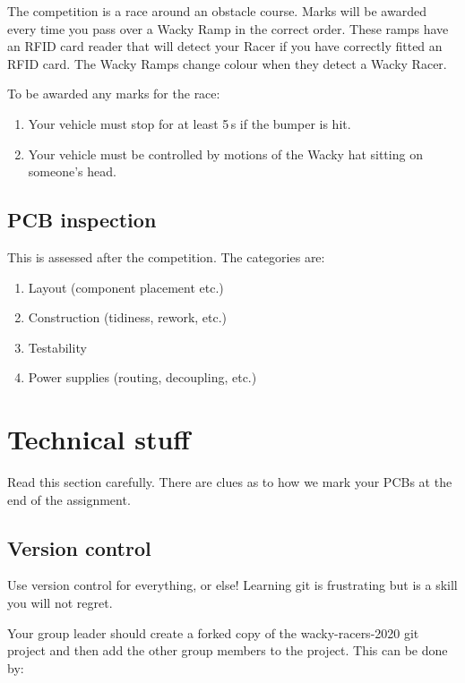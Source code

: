 \documentclass[11pt, a4paper]{article}
\begin{document}
The competition is a race around an obstacle course.  Marks will be
awarded every time you pass over a Wacky Ramp in the correct order.
These ramps have an RFID card reader that will detect your Racer if
you have correctly fitted an RFID card.  The Wacky Ramps change colour
when they detect a Wacky Racer.

To be awarded any marks for the race:
%
\begin{enumerate}
\item Your vehicle must stop for at least 5\,s if the bumper is hit.

\item Your vehicle must be controlled by motions of the Wacky hat
  sitting on someone's head.
\end{enumerate}


\subsection{PCB inspection}

This is assessed after the competition.  The categories are:
%
\begin{enumerate}
\item Layout (component placement etc.)
\item Construction (tidiness, rework, etc.)
\item Testability  
\item Power supplies (routing, decoupling, etc.)
\end{enumerate}



\section{Technical stuff}

Read this section carefully.  There are clues as to how we mark your
PCBs at the end of the assignment.


\subsection{Version control}

Use version control for everything, or else!  Learning git is
frustrating but is a skill you will not regret.

Your group leader should create a forked copy of the wacky-racers-2020
git project and then add the other group members to the project.  This
can be done by:
\end{document}
